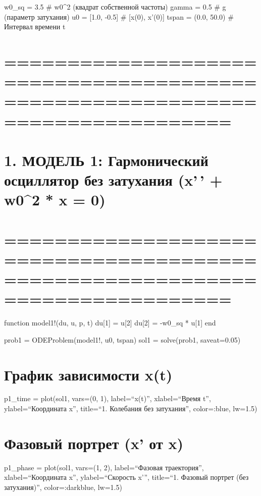 \documentclass[
  english,
  russian,
  12pt,
  a4paper,
  DIV=11,
  numbers=noendperiod]{scrreprt}
\begin{document}
w0\_sq = 3.5 \# w0\^{}2 (квадрат собственной частоты) gamma = 0.5 \# g
(параметр затухания) u0 = {[}1.0, -0.5{]} \# {[}x(0), x'(0){]} tspan =
(0.0, 50.0) \# Интервал времени t

\chapter{==============================================================================}\label{section}

\chapter{1. МОДЕЛЬ 1: Гармонический осциллятор без затухания (x'\,' +
w0\^{}2 * x =
0)}\label{ux43cux43eux434ux435ux43bux44c-1-ux433ux430ux440ux43cux43eux43dux438ux447ux435ux441ux43aux438ux439-ux43eux441ux446ux438ux43bux43bux44fux442ux43eux440-ux431ux435ux437-ux437ux430ux442ux443ux445ux430ux43dux438ux44f-x-w02-x-0}

\chapter{==============================================================================}\label{section-1}

function model1!(du, u, p, t) du{[}1{]} = u{[}2{]} du{[}2{]} = -w0\_sq *
u{[}1{]} end

prob1 = ODEProblem(model1!, u0, tspan) sol1 = solve(prob1, saveat=0.05)

\chapter{График зависимости
x(t)}\label{ux433ux440ux430ux444ux438ux43a-ux437ux430ux432ux438ux441ux438ux43cux43eux441ux442ux438-xt}

p1\_time = plot(sol1, vars=(0, 1), label=\enquote{x(t)},
xlabel=\enquote{Время t}, ylabel=\enquote{Координата x},
title=\enquote{1. Колебания без затухания}, color=:blue, lw=1.5)

\chapter{Фазовый портрет (x' от
x)}\label{ux444ux430ux437ux43eux432ux44bux439-ux43fux43eux440ux442ux440ux435ux442-x-ux43eux442-x}

p1\_phase = plot(sol1, vars=(1, 2), label=\enquote{Фазовая траектория},
xlabel=\enquote{Координата x}, ylabel=\enquote{Скорость x'},
title=\enquote{1. Фазовый портрет (без затухания)}, color=:darkblue,
lw=1.5)
\end{document}
